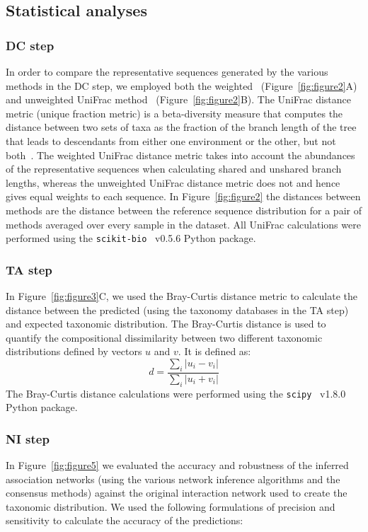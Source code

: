\documentclass[letterpaper,12pt]{article}
\begin{document}
  \subsection*{Statistical analyses}

  \subsubsection*{DC step}
  \vspace{-5mm}
  In order to compare the representative sequences generated by the various methods in the DC step, we employed both the weighted~\cite{Lozupone2007} (Figure~\ref{fig:figure2}A) and unweighted UniFrac method~\cite{Lozupone2005} (Figure~\ref{fig:figure2}B).
  The UniFrac distance metric (unique fraction metric) is a beta-diversity measure that computes the distance between two sets of taxa as the fraction of the branch length of the tree that leads to descendants from either one environment or the other, but not both~\cite{Lozupone2005}.
  The weighted UniFrac distance metric takes into account the abundances of the representative sequences when calculating shared and unshared branch lengths, whereas the unweighted UniFrac distance metric does not and hence gives equal weights to each sequence.
  In Figure~\ref{fig:figure2} the distances between methods are the distance between the reference sequence distribution for a pair of methods averaged over every sample in the dataset.
  All UniFrac calculations were performed using the \texttt{scikit-bio}~\cite{thescikit-biodevelopmentteamScikitbioBioinformaticsLibrary2022} v0.5.6 Python package.

  \subsubsection*{TA step}
  \vspace{-5mm}
  In Figure~\ref{fig:figure3}C, we used the Bray-Curtis distance metric to calculate the distance between the predicted (using the taxonomy databases in the TA step) and expected taxonomic distribution.
  The Bray-Curtis distance is used to quantify the compositional dissimilarity between two different taxonomic distributions defined by vectors $u$ and $v$.
  It is defined as:
  $$d = \frac{\sum_i{|u_i-v_i|}}{\sum_i{|u_i+v_i|}}$$
  The Bray-Curtis distance calculations were performed using the \texttt{scipy}~\cite{virtanenSciPyFundamentalAlgorithms2020} v1.8.0 Python package.

  \subsubsection*{NI step}
  \vspace{-5mm}
  In Figure~\ref{fig:figure5} we evaluated the accuracy and robustness of the inferred association networks (using the various network inference algorithms and the consensus methods) against the original interaction network used to create the taxonomic distribution.
  We used the following formulations of precision and sensitivity to calculate the accuracy of the predictions:
\end{document}
